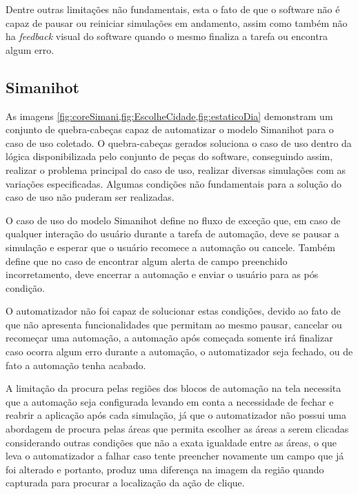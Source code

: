 \documentclass[tg]{mdtufsm}
\begin{document}
                Dentre outras limitações não fundamentais, esta o fato de que o software não é capaz de pausar ou reiniciar simulações em andamento, assim como também não ha \emph{feedback} visual do software quando o mesmo finaliza a tarefa ou encontra algum erro.

                \subsection {Simanihot}

                    As imagens \ref{fig:coreSimani,fig:EscolheCidade,fig:estaticoDia} demonstram um conjunto de quebra-cabeças capaz de automatizar o modelo Simanihot para o caso de uso coletado. O quebra-cabeças gerados soluciona o caso de uso dentro da lógica disponibilizada pelo conjunto de peças do software, conseguindo assim, realizar o problema principal do caso de uso, realizar diversas simulações com as variações especificadas. Algumas condições não fundamentais para a solução do caso de uso não puderam ser realizadas.

                    O caso de uso do modelo Simanihot define no fluxo de exceção que, em caso de qualquer interação do usuário durante a tarefa de automação, deve se pausar a simulação e esperar que o usuário recomece a automação ou cancele. Também define que no caso de encontrar algum alerta de campo preenchido incorretamento, deve encerrar a automação e enviar o usuário para as pós condição.

                    O automatizador não foi capaz de solucionar estas condições, devido ao fato de que não apresenta funcionalidades que permitam ao mesmo pausar, cancelar ou recomeçar uma automação, a automação após começada somente irá finalizar caso ocorra algum erro durante a automação, o automatizador seja fechado, ou de fato a automação tenha acabado.

                    A limitação da procura pelas regiões dos blocos de automação na tela necessita que a automação seja configurada levando em conta a necessidade de fechar e reabrir a aplicação após cada simulação, já que o automatizador não possui uma abordagem de procura pelas áreas que permita escolher as áreas a serem clicadas considerando outras condições que não a exata igualdade entre as áreas, o que leva o automatizador a falhar caso tente preencher novamente um campo que já foi alterado e portanto, produz uma diferença na imagem da região quando capturada para procurar a localização da ação de clique.
\end{document}
